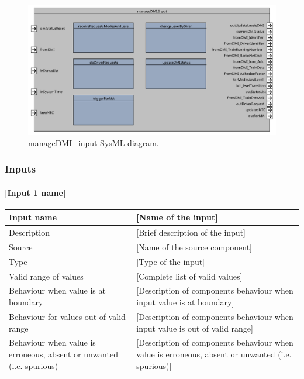 \begin{figure}
\center
\includegraphics[width=\textwidth]{images/F2_10_manageDMI_input.pdf}
\caption{manageDMI\_input SysML diagram.}\label{f:ManageDMIInput}
\end{figure}


\subsubsection{Inputs}\label{s:ManageDMIInput_inputs}

\paragraph{[Input 1 name]}

\begin{longtable}{p{}p{}}
\toprule
Input name				& [Name of the input] \\
\midrule
Description				& [Brief description of the input] \\
\midrule
Source					& [Name of the source component] \\ 
\midrule
Type					& [Type of the input] \\
\midrule
Valid range of values	& [Complete list of valid values] \\
\midrule
Behaviour when value is at boundary	& [Description of components behaviour when input value is at boundary] \\
\midrule
Behaviour for values out of valid range	& [Description of components behaviour when input value is out of valid range] \\
\midrule
Behaviour when value is erroneous, absent or unwanted (i.e. spurious) & [Description of components behaviour when value is erroneous, absent or unwanted (i.e. spurious)] \\
\bottomrule
\end{longtable}


